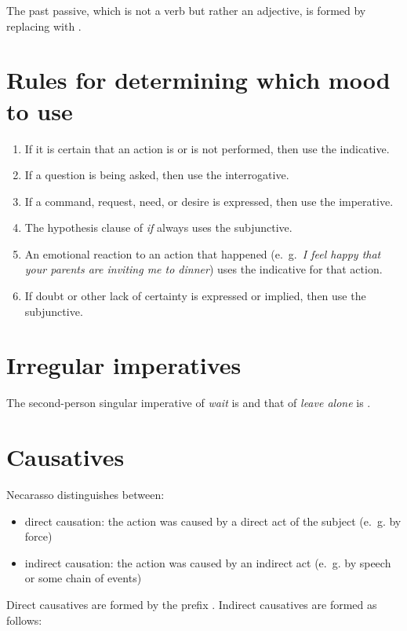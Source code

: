 \documentclass{book}
\begin{document}
The past passive, which is not a verb but rather an adjective, is formed by replacing  with .

\section{Rules for determining which mood to use}

\begin{enumerate}
  \item If it is certain that an action is or is not performed, then use the indicative.
  \item If a question is being asked, then use the interrogative.
  \item If a command, request, need, or desire is expressed, then use the imperative.
  \item The hypothesis clause of  \emph{if} always uses the subjunctive.
  \item An emotional reaction to an action that happened (e.~g.~\emph{I feel happy that your parents are inviting me to dinner}) uses the indicative for that action.
  \item If doubt or other lack of certainty is expressed or implied, then use the subjunctive.
\end{enumerate}

\section{Irregular imperatives}

The second-person singular imperative of  \emph{wait} is  and that of  \emph{leave alone} is .

\section{Causatives}

Necarasso distinguishes between:

\begin{itemize}
  \item direct causation: the action was caused by a direct act of the subject (e.~g. by force)
  \item indirect causation: the action was caused by an indirect act (e.~g. by speech or some chain of events)
\end{itemize}

Direct causatives are formed by the prefix . Indirect causatives are formed as follows:
\end{document}
